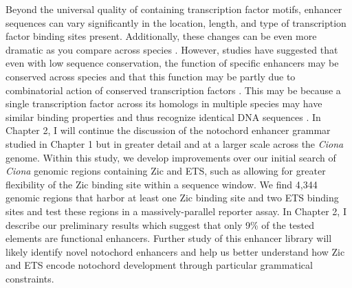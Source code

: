 \begin{dissertationintroduction}
    Beyond the universal quality of containing transcription factor motifs, enhancer sequences can vary significantly in the location, length, and type of transcription factor binding sites present. Additionally, these changes can be even more dramatic as you compare across species \cite{villar2015, ward2012, wong2020}. However, studies have suggested that even with low sequence conservation, the function of specific enhancers may be conserved across species and that this function may be partly due to combinatorial action of conserved transcription factors \cite{claussnitzer2014, wong2020}. This may be because a single transcription factor across its homologs in multiple species may have similar binding properties and thus recognize identical DNA sequences \cite{peter2011, wong2020}. In Chapter 2, I will continue the discussion of the notochord enhancer grammar studied in Chapter 1 but in greater detail and at a larger scale across the \textit{Ciona} genome. Within this study, we develop improvements over our initial search of \textit{Ciona} genomic regions containing Zic and ETS, such as allowing for greater flexibility of the Zic binding site within a sequence window. We find 4,344 genomic regions that harbor at least one Zic binding site and two ETS binding sites and test these regions in a massively-parallel reporter assay. In Chapter 2, I describe our preliminary results which suggest that only 9\% of the tested elements are functional enhancers. Further study of this enhancer library will likely identify novel notochord enhancers and help us better understand how Zic and ETS encode notochord development through particular grammatical constraints. 
    

\end{dissertationintroduction}
